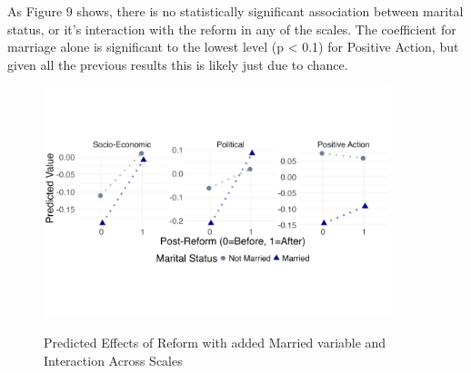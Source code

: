 \documentclass[12pt,letterpaper]{article}
\begin{document}
\begin{enumerate}
	\noindent As Figure 9 shows, there is no statistically significant association between marital status, or it's interaction with the reform in any of the scales. The coefficient for marriage alone is significant to the lowest level (p < 0.1) for Positive Action, but given all the previous results this is likely just due to chance. 
	
	\begin{figure}[H]
		\centering
		\caption{Predicted Effects of Reform with added Married variable and Interaction Across Scales}
		\vspace{-1cm}
		\includegraphics[width=0.9\textwidth]{married_plot}
		\label{fig:married_plot}
	\end{figure}
	

\end{enumerate}
\end{document}
